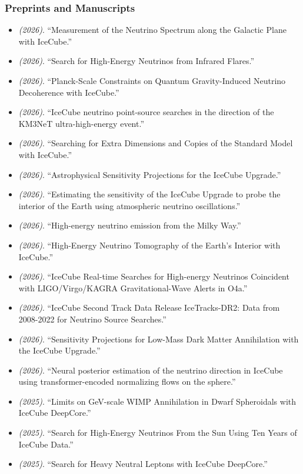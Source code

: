 \subsubsection{Preprints and Manuscripts}
\begin{itemize}
\item \textit{(2026)}. ``Measurement of the Neutrino Spectrum along the Galactic Plane with IceCube.''  
\item \textit{(2026)}. ``Search for High-Energy Neutrinos from Infrared Flares.''  
\item \textit{(2026)}. ``Planck-Scale Constraints on Quantum Gravity-Induced Neutrino Decoherence with IceCube.''  
\item \textit{(2026)}. ``IceCube neutrino point-source searches in the direction of the KM3NeT ultra-high-energy event.'' 
\item \textit{(2026)}. ``Searching for Extra Dimensions and Copies of the Standard Model with IceCube.'' 
\item \textit{(2026)}. ``Astrophysical Sensitivity Projections for the IceCube Upgrade.'' 
\item \textit{(2026)}. ``Estimating the sensitivity of the IceCube Upgrade to probe the interior of the Earth using atmospheric neutrino oscillations.'' 
\item \textit{(2026)}. ``High-energy neutrino emission from the Milky Way.'' 
\item \textit{(2026)}. ``High-Energy Neutrino Tomography of the Earth's Interior with IceCube.'' 
\item \textit{(2026)}. ``IceCube Real-time Searches for High-energy Neutrinos Coincident with LIGO/Virgo/KAGRA Gravitational-Wave Alerts in O4a.'' 
\item \textit{(2026)}. ``IceCube Second Track Data Release IceTracks-DR2: Data from 2008-2022 for Neutrino Source Searches.'' 
\item \textit{(2026)}. ``Sensitivity Projections for Low-Mass Dark Matter Annihilation with the IceCube Upgrade.'' 
\item \textit{(2026)}. ``Neural posterior estimation of the neutrino direction in IceCube using transformer-encoded normalizing flows on the sphere.'' 
\item \textit{(2025)}. ``Limits on GeV-scale WIMP Annihilation in Dwarf Spheroidals with IceCube DeepCore.'' 
\item \textit{(2025)}. ``Search for High-Energy Neutrinos From the Sun Using Ten Years of IceCube Data.'' 
\item \textit{(2025)}. ``Search for Heavy Neutral Leptons with IceCube DeepCore.'' 
\end{itemize}
\medskip

